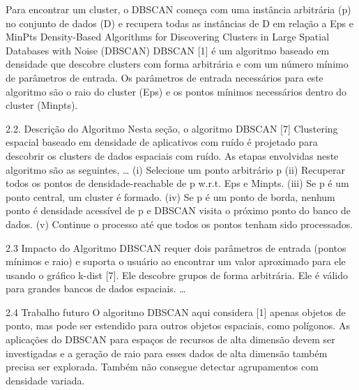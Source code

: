 Para encontrar um cluster, o DBSCAN começa com uma instância arbitrária (p) no conjunto de dados (D) e recupera todas as instâncias de D em relação a Eps e MinPts
Density-Based Algorithms for Discovering Clusters in Large Spatial Databases with Noise (DBSCAN)
DBSCAN [1] é um algoritmo baseado em densidade que descobre clusters com forma arbitrária e com um número mínimo de parâmetros de entrada. Os parâmetros de entrada necessários para este algoritmo são o raio do cluster (Eps) e os pontos mínimos necessários dentro do cluster (Minpts).

2.2. Descrição do Algoritmo
Nesta seção, o algoritmo DBSCAN [7] Clustering espacial baseado em densidade de aplicativos com ruído é projetado para descobrir os clusters de dados espaciais com ruído. As etapas envolvidas neste algoritmo são as seguintes,
…
(i) Selecione um ponto arbitrário p
(ii) Recuperar todos os pontos de densidade-reachable de p w.r.t. Eps e Minpts.
(iii) Se p é um ponto central, um cluster é formado.
(iv) Se p é um ponto de borda, nenhum ponto é densidade acessível de p e DBSCAN visita o próximo ponto do banco de dados.
(v) Continue o processo até que todos os pontos tenham sido processados.

2.3 Impacto do Algoritmo
DBSCAN requer dois parâmetros de entrada (pontos mínimos e raio) e suporta o usuário ao encontrar um valor aproximado para ele usando o gráfico k-dist [7]. Ele descobre grupos de forma arbitrária. Ele é válido para grandes bancos de dados espaciais.
…

2.4 Trabalho futuro
O algoritmo DBSCAN aqui considera [1] apenas objetos de ponto, mas pode ser estendido para outros objetos espaciais, como polígonos. As aplicações do DBSCAN para espaços de recursos de alta dimensão devem ser investigadas e a geração de raio para esses dados de alta dimensão também precisa ser explorada. Também não consegue detectar agrupamentos com densidade variada.

